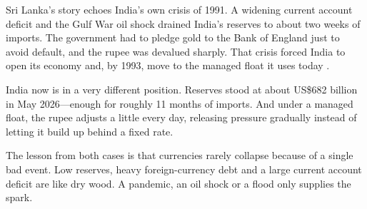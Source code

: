  Sri Lanka's story echoes India's own crisis of 1991. A widening current account deficit and the Gulf War oil shock drained India's reserves to about two weeks of imports. The government had to pledge gold to the Bank of England just to avoid default, and the rupee was devalued sharply. That crisis forced India to open its economy and, by 1993, move to the managed float it uses today .

India now is in a very different position. Reserves stood at about US\$682 billion in May 2026---enough for roughly 11 months of imports.\cite{rbi2026c} And under a managed float, the rupee adjusts a little every day, releasing pressure gradually instead of letting it build up behind a fixed rate.


The lesson from both cases is that currencies rarely collapse because of a single bad event. Low reserves, heavy foreign-currency debt and a large current account deficit are like dry wood. A pandemic, an oil shock or a flood only supplies the spark.
